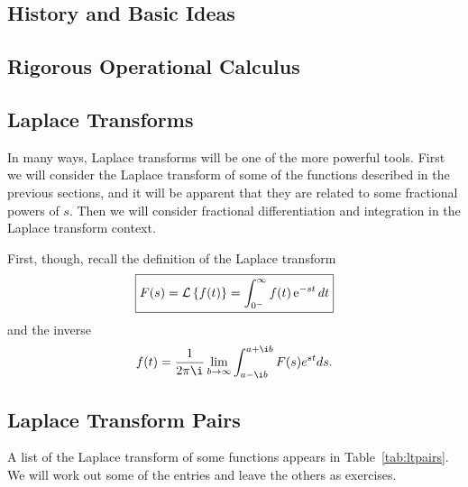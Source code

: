    \subsection{History and Basic Ideas}
    \subsection{Rigorous Operational Calculus}
    \subsection{Laplace Transforms}

    In many ways, Laplace transforms will be one of the more powerful tools. First we will consider the Laplace transform of some of the functions described in the previous sections, and it will be apparent that they are related to some fractional powers of $s$. Then we will consider fractional differentiation and integration in the Laplace transform context.

    First, though, recall the definition of the Laplace transform
    \begin{equation}
      \boxed{ F(s) = \mathcal L \left\{ f(t) \right\} = \int_{0^-}^\infty f(t) \operatorname{e}^{-s t} dt
      }
      \label{eq:laplacedef}
    \end{equation} 
    and the inverse
    \begin{equation}
      f(t) = \frac{1}{2 \pi \i} \lim_{b \rightarrow \infty} \int_{a - \i b}^{a + \i b} F(s) e^{s t} ds.
      \label{eq:inverselaplace}
    \end{equation}

    \subsection{Laplace Transform Pairs}

    A list of the Laplace transform of some functions appears in Table~\ref{tab:ltpairs}. We will work out some of the entries and leave the others as exercises.

